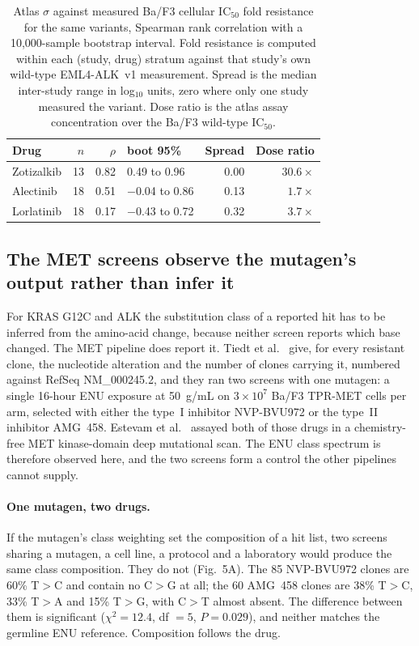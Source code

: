 \documentclass[11pt,a4paper]{article}
\begin{document}
\begin{table}[htbp]
\centering
\small
\caption{Atlas $\sigma$ against measured Ba/F3 cellular IC$_{50}$ fold
resistance for the same variants, Spearman rank correlation with a
10,000-sample bootstrap interval. Fold resistance is computed within each
(study, drug) stratum against that study's own wild-type EML4-ALK~v1
measurement. Spread is the median inter-study range in log$_{10}$ units,
zero where only one study measured the variant. Dose ratio is the atlas
assay concentration over the Ba/F3 wild-type IC$_{50}$.}
\label{tab:transport}
\begin{tabular}{lrrlrr}
\toprule
\textbf{Drug} & $n$ & $\rho$ & \textbf{boot 95\%} & \textbf{Spread} & \textbf{Dose ratio} \\
\midrule
Zotizalkib & 13 & 0.82 & 0.49 to 0.96   & 0.00 & $30.6\times$ \\
Alectinib  & 18 & 0.51 & $-$0.04 to 0.86 & 0.13 & $1.7\times$ \\
Lorlatinib & 18 & 0.17 & $-$0.43 to 0.72 & 0.32 & $3.7\times$ \\
\bottomrule
\end{tabular}
\end{table}

\subsection{The MET screens observe the mutagen's output rather than infer it}
\label{sec:met}

For KRAS G12C and ALK the substitution class of a reported hit has to be
inferred from the amino-acid change, because neither screen reports which
base changed. The MET pipeline does report it. Tiedt et al.\
\citep{tiedt2011} give, for every resistant clone, the nucleotide
alteration and the number of clones carrying it, numbered against
RefSeq NM\_000245.2, and they ran two screens with one mutagen: a single
16-hour ENU exposure at 50~\textmu g/mL on $3 \times 10^7$ Ba/F3 TPR-MET
cells per arm, selected with either the type~I inhibitor NVP-BVU972 or
the type~II inhibitor AMG~458. Estevam et al.\ \citep{estevam2024}
assayed both of those drugs in a chemistry-free MET kinase-domain deep
mutational scan. The ENU class spectrum is therefore observed here, and
the two screens form a control the other pipelines cannot supply.

\paragraph{One mutagen, two drugs.}
If the mutagen's class weighting set the composition of a hit list, two
screens sharing a mutagen, a cell line, a protocol and a laboratory
would produce the same class composition. They do not
(Fig.~5A). The 85 NVP-BVU972 clones are 60\% T$>$C and
contain no C$>$G at all; the 60 AMG~458 clones are 38\% T$>$C, 33\%
T$>$A and 15\% T$>$G, with C$>$T almost absent. The difference between
them is significant ($\chi^2 = 12.4$, df $= 5$, $P = 0.029$), and
neither matches the germline ENU reference. Composition follows the
drug.
\end{document}
